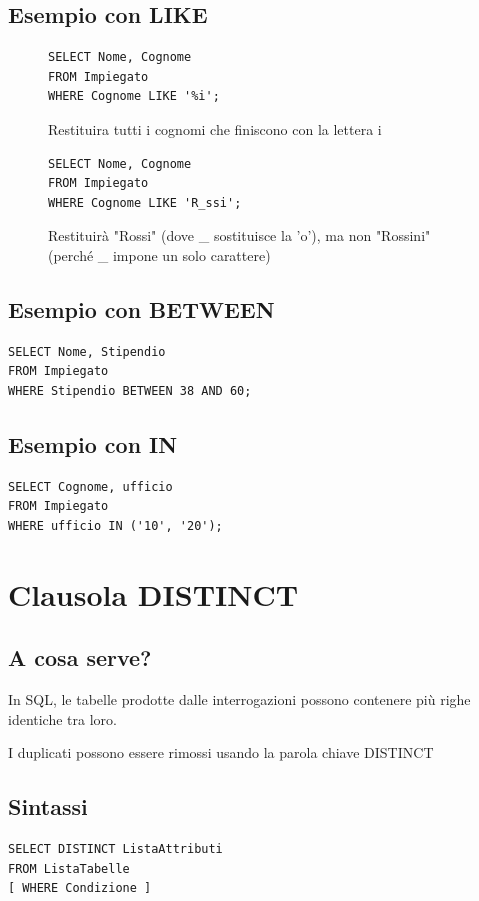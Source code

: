 \subsection{Esempio con LIKE}
\begin{figure}[htpb]
\begin{lstlisting}[language=sql_generic]
SELECT Nome, Cognome 
FROM Impiegato 
WHERE Cognome LIKE '%i';
\end{lstlisting}
\caption{Restituira tutti i cognomi che finiscono con la lettera i}
\end{figure}
\begin{figure}[htpb]
    \begin{lstlisting}[language=sql_generic]
SELECT Nome, Cognome 
FROM Impiegato 
WHERE Cognome LIKE 'R_ssi';
    \end{lstlisting}
    \caption{Restituirà "Rossi" (dove \_ sostituisce la 'o'), ma non "Rossini" (perché \_ impone un solo carattere)}
\end{figure}

\subsection{Esempio con BETWEEN}
\begin{lstlisting}[language=sql_generic]
SELECT Nome, Stipendio 
FROM Impiegato 
WHERE Stipendio BETWEEN 38 AND 60;
\end{lstlisting}

\subsection{Esempio con IN}
\begin{lstlisting}[language=sql_generic]
SELECT Cognome, ufficio 
FROM Impiegato 
WHERE ufficio IN ('10', '20');
\end{lstlisting}

\section{Clausola DISTINCT}
\subsection{A cosa serve?}
In SQL, le tabelle prodotte dalle interrogazioni possono contenere più righe identiche tra loro.

I duplicati possono essere rimossi usando la parola chiave DISTINCT

\subsection{Sintassi}
\begin{lstlisting}[language=sql_generic]
SELECT DISTINCT ListaAttributi
FROM ListaTabelle
[ WHERE Condizione ]
\end{lstlisting}

